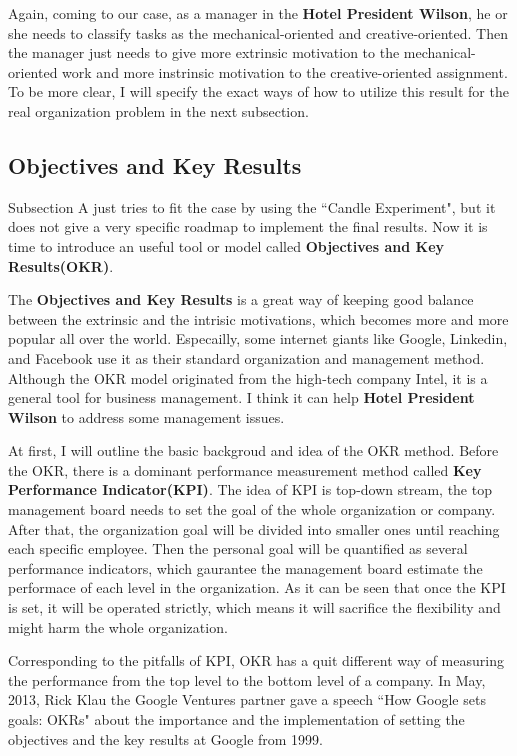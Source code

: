 \documentclass[12pt,onecolumn,a4paper]{IEEEtran}
\begin{document}
Again, coming to our case, as a manager in the \textbf{Hotel President Wilson}, he or she needs to classify tasks as the mechanical-oriented and creative-oriented. Then the manager just needs to give more extrinsic motivation to the mechanical-oriented work and more instrinsic motivation to the creative-oriented assignment. To be more clear, I will specify the exact ways of how to utilize this result for the real organization problem in the next subsection.

\subsection{\textbf{Objectives and Key Results}}
Subsection A just tries to fit the case by using the ``Candle Experiment", but it does not give a very specific roadmap to implement the final results. Now it is time to introduce an useful tool or model called \textbf{Objectives and Key Results(OKR)}. 

The \textbf{Objectives and Key Results} is a great way of keeping good balance between the extrinsic and the intrisic motivations, which becomes more and more popular all over the world. Especailly, some internet giants like Google, Linkedin, and Facebook use it as their standard organization and management method. Although the OKR model originated from the high-tech company Intel, it is a general tool for business management. I think it can help \textbf{Hotel President Wilson} to address some management issues. 

At first, I will outline the basic backgroud and idea of the OKR method. Before the OKR, there is a dominant performance measurement method called \textbf{Key Performance Indicator(KPI)}. The idea of KPI is top-down stream, the top management board needs to set the goal of the whole organization or company. After that, the organization goal will be divided into smaller ones until reaching each specific employee. Then the personal goal will be quantified as several performance indicators, which gaurantee the management board estimate the performace of each level in the organization. As it can be seen that once the KPI is set, it will be operated strictly, which means it will sacrifice the flexibility and might harm the whole organization. 

Corresponding to the pitfalls of KPI, OKR has a quit different way of measuring the performance from the top level to the bottom level of a company. In May, 2013, Rick Klau the Google Ventures partner gave a speech ``How Google sets goals: OKRs"\cite{OKRGV} about the importance and the implementation of setting the objectives and the key results at Google from 1999. 
\end{document}
